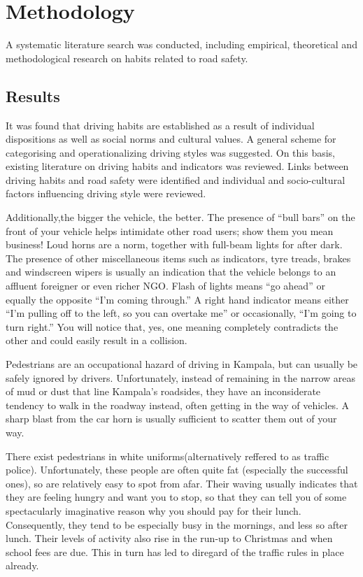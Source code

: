 \documentclass{article}                    %
\begin{document}
\section{Methodology}
A systematic literature search was conducted, including empirical, theoretical and methodological research on habits related to road safety. 
\vspace{2.00\baselineskip}
\subsection{Results}
It was found that driving habits are established as a result of individual dispositions as well as social norms and cultural values. A general scheme for categorising and operationalizing driving styles was suggested. On this basis, existing literature on driving habits and indicators was reviewed. Links between driving habits and road safety were identified and individual and socio-cultural factors influencing driving style were reviewed.

Additionally,the bigger the vehicle, the better. The presence of “bull bars” on the front of your vehicle helps intimidate other road users; show them you mean business! Loud horns are a norm, together with full-beam lights for after dark.
The presence of other miscellaneous items such as indicators, tyre treads, brakes and windscreen wipers is usually an indication that the vehicle belongs to an affluent foreigner or even richer NGO.
Flash of lights means “go ahead” or equally the opposite “I’m coming through.”
A right hand indicator means either “I’m pulling off to the left, so you can overtake me” or occasionally, “I’m going to turn right.”
You will notice that, yes, one meaning completely contradicts the other and could easily result in a collision.

Pedestrians are an occupational hazard of driving in Kampala, but can usually be safely ignored by drivers. Unfortunately, instead of remaining in the narrow areas of mud or dust that line Kampala’s roadsides, they have an inconsiderate tendency to walk in the roadway instead, often getting in the way of vehicles. A sharp blast from the car horn is usually sufficient to scatter them out of your way.

There exist pedestrians in white uniforms(alternatively reffered to as traffic police).
Unfortunately, these people are often quite fat (especially the successful ones), so are relatively easy to spot from afar. Their waving usually indicates that they are feeling hungry and want you to stop, so that they can tell you of some spectacularly imaginative reason why you should pay for their lunch. Consequently, they tend to be especially busy in the mornings, and less so after lunch. Their levels of activity also rise in the run-up to Christmas and when school fees are due. This in turn has led to diregard of the traffic rules in place already.
\end{document}
